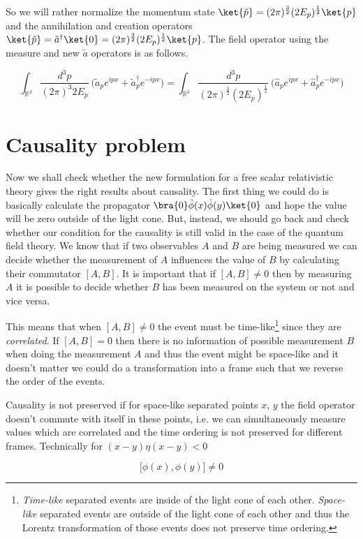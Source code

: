 So we will rather normalize the momentum state $\ket{\tilde{p}} = (2 \pi)^{\frac{3}{2}} (2 E_{p})^{\frac{1}{2}} \ket{p}$ and
the annihilation and creation operators $\ket{\tilde{p}} = \tilde{a}^{\dagger} \ket{0} = (2 \pi)^{\frac{3}{2}} (2 E_{p})^{\frac{1}{2}} \ket{p}$.
The field operator using the measure and new $\tilde{a}$ operators is as follows.

\begin{equation*}
    \int_{\mathbb{R}^{3}} \frac{d^{3}p}{(2 \pi)^{3} 2 E_{p}} \ \big(\tilde{a}_{p} e^{i p x} + \tilde{a}^{\dagger}_{p} e^{- i p x}\big) = 
    \int_{\mathbb{R}^{3}} \frac{d^{3}p}{(2 \pi)^{\frac{3}{2}} (2 E_{p})^{\frac{1}{2}}} \ \big(\hat{a}_{p} e^{i p x} + \hat{a}^{\dagger}_{p} e^{- i p x}\big)
\end{equation*}

\section{Causality problem}

Now we shall check whether the new formulation for a free scalar relativistic theory gives the right results about causality.
The first thing we could do is basically calculate the propagator $\bra{0} \hat{\phi}(x) \hat{\phi}(y) \ket{0}$ and hope the 
value will be zero outside of the light cone. But, instead, we should go back and check whether our condition for the causality
is still valid in the case of the quantum field theory. We know that if two observables $A$ and $B$ are being measured we can
decide whether the measurement of $A$ influences the value of $B$ by calculating their commutator $[A, B]$. It is important that
if $[A, B] \neq 0$ then by measuring $A$ it is possible to decide whether $B$ has been measured on the system or not and vice 
versa.

This means that when $[A, B] \neq 0$ the event must be time-like\footnote{
\textit{Time-like} separated events are inside of the light cone of each other.
\textit{Space-like} separated events are outside of the light cone of each other and thus the Lorentz transformation of those 
events does not preserve time ordering.} since they are \textit{correlated}. If $[A, B] = 0$ then there is no information of possible
measurement $B$ when doing the measurement $A$ and thus the event might be space-like and it doesn't matter we could do a transformation
into a frame such that we reverse the order of the events.

\begin{definition}
    \label{df:causality_field_theory}
    Causality is not preserved if for space-like separated points $x$, $y$ the field operator doesn't commute with itself in these points, i.e.
    we can simultaneously measure values which are correlated and the time ordering is not preserved for different frames. Technically for
    $(x - y) \eta (x - y) < 0$

    \begin{equation}
        \big[\phi(x), \phi(y)\big] \neq 0
    \end{equation}

\end{definition}

